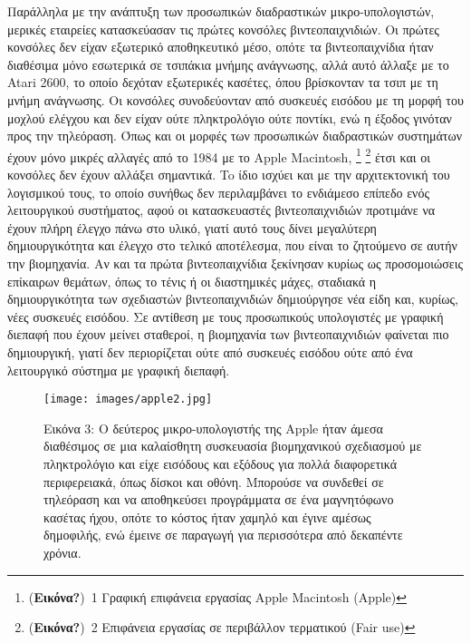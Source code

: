 \documentclass[
]{article}
\begin{document}
Παράλληλα με την ανάπτυξη των προσωπικών διαδραστικών μικρο-υπολογιστών,
μερικές εταιρείες κατασκεύασαν τις πρώτες κονσόλες βιντεοπαιχνιδιών. Οι
πρώτες κονσόλες δεν είχαν εξωτερικό αποθηκευτικό μέσο, οπότε τα
βιντεοπαιχνίδια ήταν διαθέσιμα μόνο εσωτερικά σε τσιπάκια μνήμης
ανάγνωσης, αλλά αυτό άλλαξε με το Atari 2600, το οποίο δεχόταν
εξωτερικές κασέτες, όπου βρίσκονταν τα τσιπ με τη μνήμη ανάγνωσης. Οι
κονσόλες συνοδεύονταν από συσκευές εισόδου με τη μορφή του μοχλού
ελέγχου και δεν είχαν ούτε πληκτρολόγιο ούτε ποντίκι, ενώ η έξοδος
γινόταν προς την τηλεόραση. Όπως και οι μορφές των προσωπικών
διαδραστικών συστημάτων έχουν μόνο μικρές αλλαγές από το 1984 με το
Apple Macintosh, \footnote{(\textbf{Εικόνα?})~1 Γραφική επιφάνεια
  εργασίας Apple Macintosh (Apple)} \footnote{(\textbf{Εικόνα?})~2
  Επιφάνεια εργασίας σε περιβάλλον τερματικού (Fair use)} έτσι και οι
κονσόλες δεν έχουν αλλάξει σημαντικά. To ίδιο ισχύει και με την
αρχιτεκτονική του λογισμικού τους, το οποίο συνήθως δεν περιλαμβάνει το
ενδιάμεσο επίπεδο ενός λειτουργικού συστήματος, αφού οι κατασκευαστές
βιντεοπαιχνιδιών προτιμάνε να έχουν πλήρη έλεγχο πάνω στο υλικό, γιατί
αυτό τους δίνει μεγαλύτερη δημιουργικότητα και έλεγχο στο τελικό
αποτέλεσμα, που είναι το ζητούμενο σε αυτήν την βιομηχανία. Αν και τα
πρώτα βιντεοπαιχνίδια ξεκίνησαν κυρίως ως προσομοιώσεις επίκαιρων
θεμάτων, όπως το τένις ή οι διαστημικές μάχες, σταδιακά η
δημιουργικότητα των σχεδιαστών βιντεοπαιχνιδιών δημιούργησε νέα είδη
και, κυρίως, νέες συσκευές εισόδου. Σε αντίθεση με τους προσωπικούς
υπολογιστές με γραφική διεπαφή που έχουν μείνει σταθεροί, η βιομηχανία
των βιντεοπαιχνιδιών φαίνεται πιο δημιουργική, γιατί δεν περιορίζεται
ούτε από συσκευές εισόδου ούτε από ένα λειτουργικό σύστημα με γραφική
διεπαφή.

\leavevmode{}%
\begin{figure}
\hypertarget{fig:apple2}{%
\centering
\texttt{[image: images/apple2.jpg]}
\caption{Εικόνα 3: Ο δεύτερος μικρο-υπολογιστής της Apple ήταν άμεσα
διαθέσιμος σε μια καλαίσθητη συσκευασία βιομηχανικού σχεδιασμού με
πληκτρολόγιο και είχε εισόδους και εξόδους για πολλά διαφορετικά
περιφερειακά, όπως δίσκοι και οθόνη. Μπορούσε να συνδεθεί σε τηλεόραση
και να αποθηκεύσει προγράμματα σε ένα μαγνητόφωνο κασέτας ήχου, οπότε το
κόστος ήταν χαμηλό και έγινε αμέσως δημοφιλής, ενώ έμεινε σε παραγωγή
για περισσότερα από δεκαπέντε χρόνια.}\label{fig:apple2}
}
\end{figure}
\end{document}
